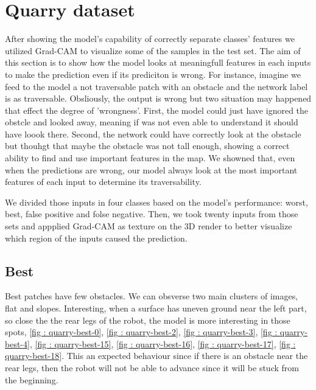 \documentclass[../document.tex]{subfiles}
\begin{document}
\section{Quarry dataset}
\label{sec: quarry-dataset}
After showing the model's capability of correctly separate classes' features we utilized Grad-CAM to visualize some of the samples in the test set. The aim of this section is to show how the model looks at meaningfull features in each inputs to make the prediction even if its prediciton is wrong. For instance, imagine we feed to the model a not traversable patch with an obstacle and the network label is as traversable. Obsliously, the output is wrong but two situation may happened that effect the degree of 'wrongness'. First, the model could just have ignored the obstcle and looked away, meaning if was not even able to understand it should have loook there. Second, the network could have correctly look at the obstacle but thouhgt that maybe the obstacle was not tall enough, showing a correct ability to find and use important features in the map. We showned that, even when the predictions are wrong, our model always look at the most important features of each input to determine its traversability. 

We divided those inputs in four classes based on the model's performance: worst, best, false positive and folse negative. Then, we took twenty inputs from those sets and appplied Grad-CAM as texture on the 3D render to better visualize which region of the inputs caused the prediction. 


\subsection{Best}
Best patches have few obstacles. We can obsverse two main clusters of images, flat and slopes. Interesting, when a surface has uneven ground near the left part, so close the the rear legs of the robot, the model is more interesting in those spots, \ref{fig : quarry-best-0}, \ref{fig : quarry-best-2}, \ref{fig : quarry-best-3}, \ref{fig : quarry-best-4}, \ref{fig : quarry-best-15}, \ref{fig : quarry-best-16}, \ref{fig : quarry-best-17}, \ref{fig : quarry-best-18}. This an expected behaviour since if there is an obstacle near the rear legs, then the robot will not be able to advance since it will be stuck from the beginning. 
\end{document}

